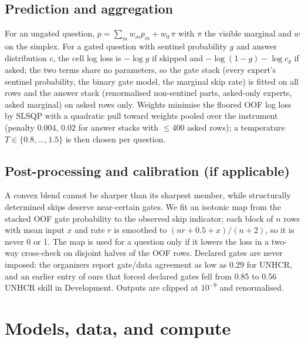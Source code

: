 \documentclass{article}
\begin{document}
\subsection{Prediction and aggregation}
\label{sec:agg}
For an ungated question, $p=\sum_m w_m p_m + w_0\,\pi$ with $\pi$ the visible marginal and $w$ on the simplex. For a gated question with sentinel probability $g$ and answer distribution $c$, the cell log loss is $-\log g$ if skipped and $-\log(1-g)-\log c_y$ if asked; the two terms share no parameters, so the gate stack (every expert's sentinel probability, the binary gate model, the marginal skip rate) is fitted on all rows and the answer stack (renormalised non-sentinel parts, asked-only experts, asked marginal) on asked rows only. Weights minimise the floored OOF log loss by SLSQP with a quadratic pull toward weights pooled over the instrument (penalty $0.004$, $0.02$ for answer stacks with $\le 400$ asked rows); a temperature $T\in\{0.8,\dots,1.5\}$ is then chosen per question.

\subsection{Post-processing and calibration (if applicable)}
\label{sec:post}
A convex blend cannot be sharper than its sharpest member, while structurally determined skips deserve near-certain gates. We fit an isotonic map from the stacked OOF gate probability to the observed skip indicator; each block of $n$ rows with mean input $x$ and rate $r$ is smoothed to $(nr+0.5+x)/(n+2)$, so it is never 0 or 1. The map is used for a question only if it lowers the loss in a two-way cross-check on disjoint halves of the OOF rows. Declared gates are never imposed: the organizers report gate/data agreement as low as 0.29 for UNHCR, and an earlier entry of ours that forced declared gates fell from 0.85 to 0.56 UNHCR skill in Development. Outputs are clipped at $10^{-9}$ and renormalised.

\section{Models, data, and compute}
\label{sec:resources}
\end{document}
